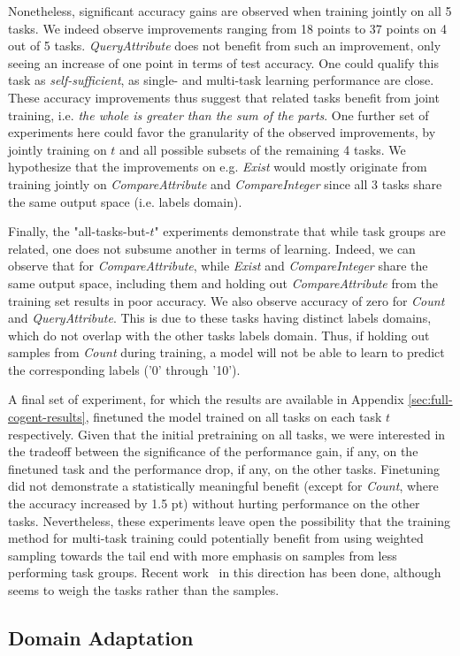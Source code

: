 Nonetheless, significant accuracy gains are observed when training jointly on all 5 tasks. We indeed observe improvements ranging from 18 points to 37 points on 4 out of 5 tasks. \textit{QueryAttribute} does not benefit from such an improvement, only seeing an increase of one point in terms of test accuracy. One could qualify this task as \textit{self-sufficient}, as single- and multi-task learning performance are close.
These accuracy improvements thus suggest that related tasks benefit from joint training, i.e. \emph{the whole is greater than the sum of the parts}. One further set of experiments here could favor the granularity of the observed improvements, by jointly training on $t$ and all possible subsets of the remaining 4 tasks. We hypothesize that the improvements on e.g. \textit{Exist} would mostly originate from training jointly on \textit{CompareAttribute} and \textit{CompareInteger} since all 3 tasks share the same output space (i.e. labels domain).

Finally, the "all-tasks-but-$t$" experiments demonstrate that while task groups are related, one does not subsume another in terms of learning. Indeed, we can observe that for \textit{CompareAttribute}, while \textit{Exist} and \textit{CompareInteger} share the same output space, including them and holding out \textit{CompareAttribute} from the training set results in poor accuracy. We also observe accuracy of zero for \textit{Count} and \textit{QueryAttribute}. This is due to these tasks having distinct labels domains, which do not overlap with the other tasks labels domain. Thus, if holding out samples from \textit{Count} during training, a model will not be able to learn to predict the corresponding labels ('0' through '10').

 
A final set of experiment, for which the results are available in Appendix \ref{sec:full-cogent-results}, finetuned the model trained on all tasks on each task $t$ respectively. Given that the initial pretraining on all tasks, we were interested in the tradeoff between the significance of the performance gain, if any, on the finetuned task and the performance drop, if any, on the other tasks. Finetuning did not demonstrate a statistically meaningful benefit (except for \textit{Count}, where the accuracy increased by 1.5 pt) without hurting performance on the other tasks. Nevertheless, these experiments leave open the possibility that the training method for multi-task training could potentially benefit from using weighted sampling towards the tail end with more emphasis on samples from less performing task groups. Recent work~\cite{guo2018dynamic, kendall2018multi} in this direction has been done, although seems to weigh the tasks rather than the samples.

\subsection{Domain Adaptation}

